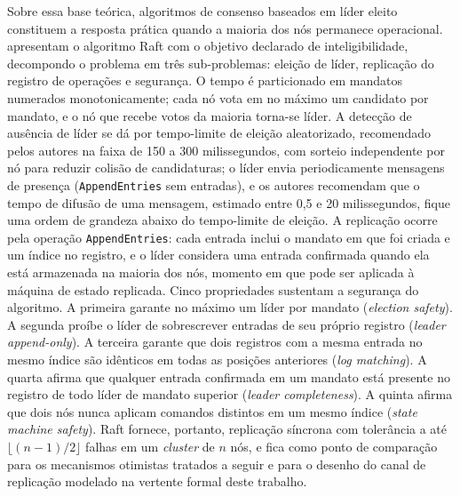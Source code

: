 Sobre essa base teórica, algoritmos de consenso baseados em líder eleito constituem a resposta prática quando a maioria dos nós permanece operacional. \citet{ongaro_raft_2014} apresentam o algoritmo Raft com o objetivo declarado de inteligibilidade, decompondo o problema em três sub-problemas: eleição de líder, replicação do registro de operações e segurança. O tempo é particionado em mandatos numerados monotonicamente; cada nó vota em no máximo um candidato por mandato, e o nó que recebe votos da maioria torna-se líder. A detecção de ausência de líder se dá por tempo-limite de eleição aleatorizado, recomendado pelos autores na faixa de 150 a 300 milissegundos, com sorteio independente por nó para reduzir colisão de candidaturas; o líder envia periodicamente mensagens de presença (\texttt{AppendEntries} sem entradas), e os autores recomendam que o tempo de difusão de uma mensagem, estimado entre 0,5 e 20 milissegundos, fique uma ordem de grandeza abaixo do tempo-limite de eleição. A replicação ocorre pela operação \texttt{AppendEntries}: cada entrada inclui o mandato em que foi criada e um índice no registro, e o líder considera uma entrada confirmada quando ela está armazenada na maioria dos nós, momento em que pode ser aplicada à máquina de estado replicada. Cinco propriedades sustentam a segurança do algoritmo. A primeira garante no máximo um líder por mandato (\emph{election safety}). A segunda proíbe o líder de sobrescrever entradas de seu próprio registro (\emph{leader append-only}). A terceira garante que dois registros com a mesma entrada no mesmo índice são idênticos em todas as posições anteriores (\emph{log matching}). A quarta afirma que qualquer entrada confirmada em um mandato está presente no registro de todo líder de mandato superior (\emph{leader completeness}). A quinta afirma que dois nós nunca aplicam comandos distintos em um mesmo índice (\emph{state machine safety}). Raft fornece, portanto, replicação síncrona com tolerância a até $\lfloor (n-1)/2 \rfloor$ falhas em um \emph{cluster} de $n$ nós, e fica como ponto de comparação para os mecanismos otimistas tratados a seguir e para o desenho do canal de replicação modelado na vertente formal deste trabalho.

